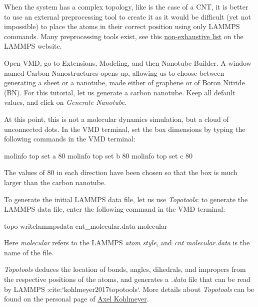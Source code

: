 \begin{tcolorbox}[colback=mylightblue!5!white,colframe=mylightblue!75!black,title=Why use a preprocessing tool?]

\vspace{0.25cm} \noindent When the system has a complex topology, like is the case of a CNT, 
it is better to use an external preprocessing tool to create it as it would be
difficult (yet not impossible) to place the atoms in their correct position
using only LAMMPS commands. Many preprocessing tools exist, see
this \href{https://www.lammps.org/prepost.html}{non-exhaustive list} on the LAMMPS website.
\end{tcolorbox}

\noindent Open VMD, go to Extensions, Modeling, and then Nanotube Builder.
A window named Carbon Nanostructures opens up, allowing us to choose
between generating a sheet or a nanotube, made either of graphene or
of Boron Nitride (BN). For this tutorial, let us generate a carbon nanotube.
Keep all default values, and click on \textit{Generate Nanotube}.

\vspace{0.25cm} \noindent At this point, this is not a molecular dynamics simulation,
but a cloud of unconnected dots. In the VMD terminal, set the
box dimensions by typing the following commands in the VMD terminal:

\begin{lcverbatim}
molinfo top set a 80  
molinfo top set b 80            
molinfo top set c 80 
\end{lcverbatim}

\noindent The values of 80 in each direction have been chosen
so that the box is much larger than the carbon nanotube.

\vspace{0.25cm} \noindent To generate the initial LAMMPS data file, let us use \textit{Topotools}:
to generate the LAMMPS data file, enter the following command
in the VMD terminal:

\begin{lcverbatim}
topo writelammpsdata cnt_molecular.data molecular
\end{lcverbatim}

\noindent Here \textit{molecular} refers to the LAMMPS \textit{atom$\_$style}, and
\textit{cnt$\_$molecular.data} is the name of the file. 

\begin{tcolorbox}[colback=mylightblue!5!white,colframe=mylightblue!75!black,title=About TopoTools]

\vspace{0.25cm} \noindent \textit{Topotools} deduces the location of bonds, angles,
dihedrals, and impropers from the respective positions of the atoms,
and generates a \textit{.data} file that can be read by LAMMPS :cite:`kohlmeyer2017topotools`.
More details about \textit{Topotools} can be found on the
personal page of \href{https://sites.google.com/site/akohlmey/software/topotools}{Axel Kohlmeyer}.
\end{tcolorbox}

